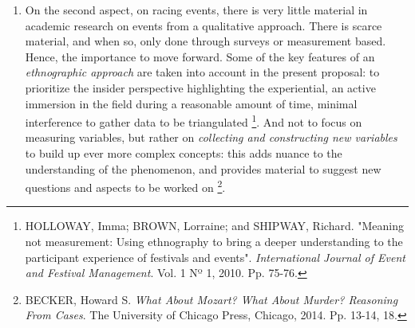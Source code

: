 \begin{enumerate}
 \item On the second aspect, on racing events, there is very little material in academic research on events from a qualitative approach. There is scarce material, and when so, only done through surveys or measurement based. Hence, the importance to move forward. Some of the key features of an \textit{ethnographic approach} are taken into account in the present proposal: to prioritize the insider perspective highlighting the experiential, an active immersion in the field during a reasonable amount of time, minimal interference to gather data to be triangulated%
 \footnote{HOLLOWAY, Imma; BROWN, Lorraine; and SHIPWAY, Richard. "Meaning not measurement: Using ethnography to bring a deeper understanding to the participant experience of festivals and events". \textit{International Journal of Event and Festival Management}. Vol. 1 Nº 1, 2010. Pp. 75-76.}.
 And not to focus on measuring variables, but rather on \textit{collecting and constructing new variables} to build up ever more complex concepts: this adds nuance to the understanding of the phenomenon, and provides material to suggest new questions and aspects to be worked on%
 \footnote{BECKER, Howard S. \textit{What About Mozart? What About Murder? Reasoning From Cases}. The University of Chicago Press, Chicago, 2014. Pp. 13-14, 18.}.

\end{enumerate}


